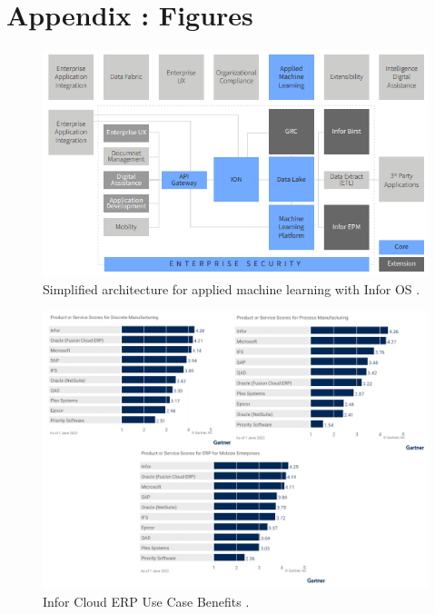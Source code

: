 \documentclass{article}
\begin{document}
\newpage

\section{Appendix : Figures}

\begin{figure}[ht!]
    \centering
    \includegraphics[width=\textwidth]{./Infor_EAP.PNG}
    \caption{Simplified architecture for applied machine learning with Infor OS \cite{infor_eai_ml_os}.}
    \label{fig:Infor_EAP}
\end{figure}

\newpage

\begin{figure}[ht!]
    \centering
    \includegraphics[width=\textwidth]{./Infor_Benefits.png}
    \caption{Infor Cloud ERP Use Case Benefits \cite{critical_cloud_erp}.}
    \label{fig:Infor_Benefits}
\end{figure}
\end{document}
